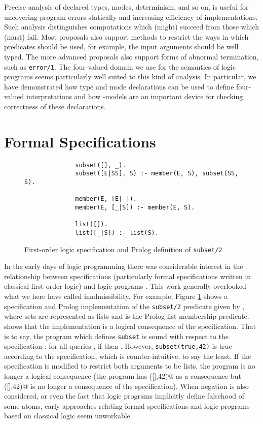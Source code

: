 \documentclass{tlp}
\begin{document}
Precise analysis of declared types, modes, determinism, and so on,
is useful for uncovering program errors statically and increasing 
efficiency of implementations.  
Such analysis distinguishes computations which
(might) succeed from those which (must) fail.  Most proposals also support
methods to restrict the ways in which predicates should be used, 
for example, the input arguments should be well typed.  
The more advanced proposals also support forms of abnormal termination,
such as \texttt{error/1}.
The four-valued domain we use for the semantics of logic programs 
seems particularly well suited to this kind of analysis.
In particular, we have demonstrated how type and mode declarations can
be used to define four-valued interpretations and how
-models are an important device for checking
correctness of these declarations.





\section{Formal Specifications}
\label{sec-specification}

\begin{figure}


\begin{verbatim}
              subset([], _).
              subset([E|SS], S) :- member(E, S), subset(SS, S).

              member(E, [E|_]).
              member(E, [_|S]) :- member(E, S).

              list([]).
              list([_|S]) :- list(S).
\end{verbatim}
\caption{First-order logic specification and Prolog definition of
\texttt{subset/2} \label{fig-subset}}
\end{figure}

In the early days of logic programming there was considerable interest
in the relationship between specifications (particularly formal
specifications written in classical first order logic) and logic programs
\cite{ClarkSickel,Hog81,SatoTamaki,Kow85}.
This work generally overlooked what we here have called inadmissibility.  
For example, Figure \ref{fig-subset}
shows a specification and Prolog implementation of the \texttt{subset/2}
predicate given by , where sets are represented as lists and
 is the Prolog list membership predicate.   shows
that the implementation is a logical consequence of the specification.
That is to say, the program  which defines \verb!subset!
is sound with respect to the specification :
for all queries , if  then .
However, \texttt{subset(true,42)} is true according to the specification,
which is counter-intuitive, to say the least.  If the specification
is modified to restrict both arguments to be lists, the program is no
longer a logical consequence (the program has \verb@subset([],42)@ as
a consequence but \verb@subset([],42)@ is no longer a consequence of
the specification).  
When negation is also considered, or even the fact that logic programs 
implicitly define falsehood of some atoms, early approaches relating
formal specifications and logic programs based on classical logic seem 
unworkable.  
\end{document}
